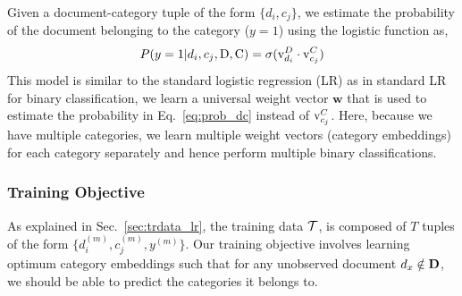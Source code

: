 Given a document-category tuple of the form $\{d_{i}, c_{j}\}$, we estimate the probability of the document belonging to the category ($y = 1$) using the logistic function as,
\begin{equation}
\label{eq:prob_dc}
P(y=1|d_{i}, c_{j}, \mathrm{D}, \mathrm{C}) = \sigma(\mathrm{v}^{D}_{d_{i}}\cdot \mathrm{v}^{C}_{c_{j}})
\end{equation}
This model is similar to the standard logistic regression (LR) as in standard LR for binary classification, we learn a universal weight vector $\mathbf{w}$ that is used to estimate the probability in Eq.~\ref{eq:prob_dc} instead of $\mathrm{v}^{C}_{c_{j}}$. Here, because we have multiple categories, we learn multiple weight vectors (category embeddings) for each category separately and hence perform multiple binary classifications.

\subsubsection{Training Objective}
\label{sec:tro_lr}
As explained in Sec.~\ref{sec:trdata_lr}, the training data $\mathcal{T}$, is composed of $T$ tuples of the form $\{ d^{(m)}_{i}, c^{(m)}_{j}, y^{(m)}\}$. Our training objective involves learning optimum category embeddings such that for any unobserved document $d_{x} \notin \mathbf{D}$, we should be able to predict the categories it belongs to.

